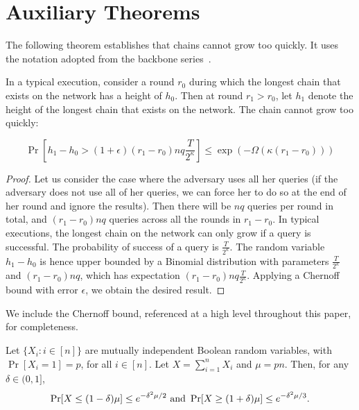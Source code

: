 \section{Auxiliary Theorems}

The following theorem establishes that chains cannot grow too quickly. It uses the
notation adopted from the backbone series~\cite{backbone,varbackbone}.

\begin{theorem*}
  In a typical execution,
consider a round $r_0$ during which the longest chain that exists on the network has
a height of $h_0$. Then at round $r_1 > r_0$, let $h_1$ denote the height of the longest
chain that exists on the network. The chain cannot grow too quickly:

\[
  \Pr[h_1 - h_0 > (1 + \epsilon) (r_1 - r_0)nq \frac{T}{2^\kappa}] \leq \exp(-\Omega(\kappa (r_1 - r_0)))
\]
\end{theorem*}
\begin{proof}
  Let us consider the case where the adversary uses all her queries (if the adversary does not use
  all of her queries, we can force her to do so at the end of her round and ignore the results).
  Then there will be $nq$ queries per round in total, and $(r_1 - r_0)nq$ queries across all the rounds
  in $r_1 - r_0$. In typical executions, the longest chain on the network can only grow if a query is successful.
  The probability of success of a query is $\frac{T}{2^\kappa}$. The random variable $h_1 - h_0$ is
  hence upper bounded by a Binomial distribution with parameters $\frac{T}{2^\kappa}$ and $(r_1 - r_0)nq$,
  which has expectation $(r_1 - r_0)nq \frac{T}{2^\kappa}$. Applying a Chernoff bound with error $\epsilon$,
  we obtain the desired result.
\end{proof}

We include the Chernoff bound, referenced at a high level throughout this paper, for completeness.

\begin{theorem}
  Let $\{X_i:i\in[n]\}$ are mutually independent Boolean random variables,
  with $\Pr[X_i=1]=p$, for all $i\in[n]$. Let $X=\sum_{i=1}^nX_i$ and $\mu=pn$.
  Then, for any $\delta\in(0,1]$,
  \[\Pr[X\le(1-\delta)\mu]\le e^{-\delta^2\mu/2}\hbox{~and~}
    \Pr[X\ge(1+\delta)\mu]\le e^{-\delta^2\mu/3}.\]
\end{theorem}
